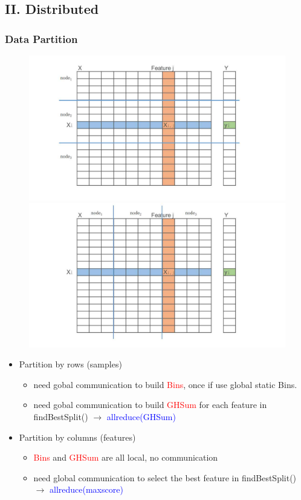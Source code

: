 \documentclass{beamer}
\begin{document}
\subsection{II. Distributed} 
\begin{frame}
	\frametitle{Data Partition}
		\begin{figure}
			\includegraphics[width=.5\linewidth]{figs/datapartition1.jpg}
			\includegraphics[width=.5\linewidth]{figs/datapartition2.jpg}
		\end{figure}
		

		\begin{itemize}
			\item Partition by rows (samples) 
			\begin{itemize}			
				\item need gobal communication to build \textcolor{red}{Bins}, once if use global static Bins.
				\item need gobal communication to build \textcolor{red}{GHSum} for each feature in findBestSplit() $\rightarrow$ \textcolor{blue}{allreduce(GHSum)}
			\end{itemize}			
			\item Partition by columns (features)
			\begin{itemize}			
				\item \textcolor{red}{Bins} and \textcolor{red}{GHSum} are all local, no communication
				\item need global communication to select the best feature in findBestSplit() $\rightarrow$ \textcolor{blue}{allreduce(maxscore)}
			\end{itemize}			
			
		\end{itemize}
	
\end{frame}
\end{document}
